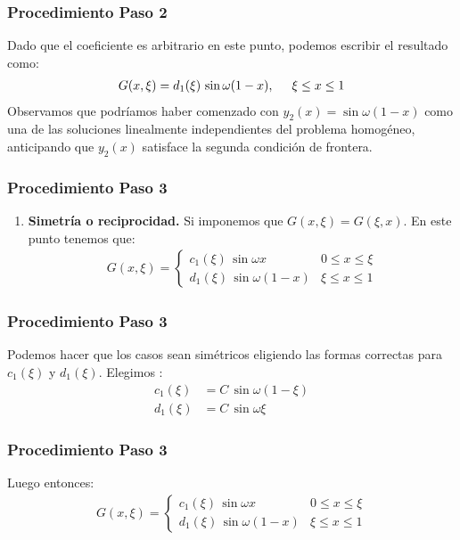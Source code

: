 \documentclass[12pt]{beamer}
\begin{document}
\begin{frame}
\frametitle{Procedimiento Paso 2}
Dado que el coeficiente es arbitrario en este punto, podemos escribir el resultado como:
\pause
\begin{align*}
G (x, \xi) = d_{1} (\xi) \, \sin \omega (1 - x), \hspace{0.5cm} \xi \leq x \leq 1
\end{align*}
\pause
Observamos que podríamos haber comenzado con $y_{2} (x) = \sin \omega (1 - x)$ como una de las soluciones linealmente independientes del problema homogéneo, anticipando que $y_{2} (x)$ satisface la segunda condición de frontera.
\end{frame}
\begin{frame}
\frametitle{Procedimiento Paso 3}
\begin{enumerate}[<+->]
\conti
\item \textbf{Simetría o reciprocidad.}
\pause
Si imponemos que $G (x, \xi) = G (\xi, x)$. \pause En este punto tenemos que:
\pause
\begin{align*}
G (x, \xi) = \begin{cases}
c_{1} (\xi) \, \sin \omega x & 0 \leq x \leq \xi \\[0.5em]
d_{1} (\xi) \, \sin \omega (1 - x) & \xi \leq x \leq 1
\end{cases}
\end{align*}
\seti
\end{enumerate}
\end{frame}
\begin{frame}
\frametitle{Procedimiento Paso 3}
Podemos hacer que los casos sean simétricos eligiendo las formas correctas para $c_{1} (\xi)$ y $d_{1} (\xi)$. Elegimos :
\pause
\begin{align*}
c_{1} (\xi) &= C \, \sin \omega (1 - \xi) \\[0.5em]
d_{1} (\xi) &= C \, \sin \omega \xi
\end{align*}
\end{frame}
\begin{frame}
\frametitle{Procedimiento Paso 3}
Luego entonces:
\pause
\begin{align*}
G (x, \xi) = \begin{cases}
c_{1} (\xi) \, \sin \omega x & 0 \leq x \leq \xi \\[0.5em]
d_{1} (\xi) \, \sin \omega (1 - x) & \xi \leq x \leq 1
\end{cases}
\end{align*}
\end{frame}
\end{document}
